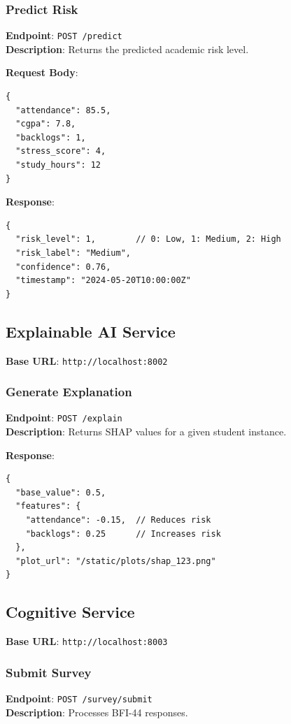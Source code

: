 \documentclass[12pt,a4paper]{report}
\begin{document}
\subsubsection{Predict Risk}
\textbf{Endpoint}: \texttt{POST /predict} \\
\textbf{Description}: Returns the predicted academic risk level.

\textbf{Request Body}:
\begin{verbatim}
{
  "attendance": 85.5,
  "cgpa": 7.8,
  "backlogs": 1,
  "stress_score": 4,
  "study_hours": 12
}
\end{verbatim}

\textbf{Response}:
\begin{verbatim}
{
  "risk_level": 1,        // 0: Low, 1: Medium, 2: High
  "risk_label": "Medium",
  "confidence": 0.76,
  "timestamp": "2024-05-20T10:00:00Z"
}
\end{verbatim}

\subsection{Explainable AI Service}
\textbf{Base URL}: \texttt{http://localhost:8002}

\subsubsection{Generate Explanation}
\textbf{Endpoint}: \texttt{POST /explain} \\
\textbf{Description}: Returns SHAP values for a given student instance.

\textbf{Response}:
\begin{verbatim}
{
  "base_value": 0.5,
  "features": {
    "attendance": -0.15,  // Reduces risk
    "backlogs": 0.25      // Increases risk
  },
  "plot_url": "/static/plots/shap_123.png"
}
\end{verbatim}

\subsection{Cognitive Service}
\textbf{Base URL}: \texttt{http://localhost:8003}

\subsubsection{Submit Survey}
\textbf{Endpoint}: \texttt{POST /survey/submit} \\
\textbf{Description}: Processes BFI-44 responses.
\end{document}
